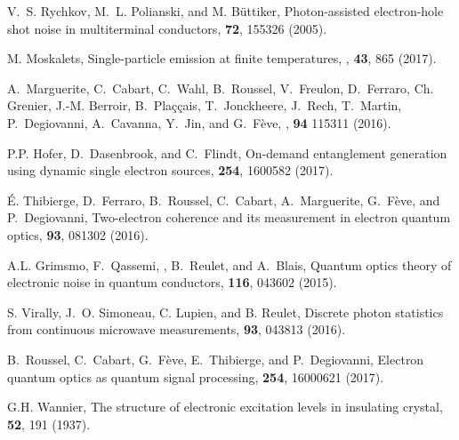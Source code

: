 \documentclass[aps,prb,superscriptaddress,preprint]{revtex4-1}
\begin{document}
\begin{thebibliography}{1}
		V.~S. Rychkov, M.~L. Polianski, and M. B\"uttiker,
		\newblock Photon-assisted electron-hole shot noise in multiterminal conductors,
		 {\bf 72}, 155326 (2005).
		
		M. Moskalets, Single-particle emission at finite temperatures, , {\bf 43}, 865 (2017).
		
		
		A.~Marguerite, C.~Cabart, C.~Wahl, B.~Roussel, V.~Freulon, D.~Ferraro, Ch.
		Grenier, J.-M. Berroir, B.~{Pla\ifmmode \mbox\c{c}\else \c{c}\fi{}ais},
		T.~Jonckheere, J.~Rech, T.~Martin, P.~Degiovanni, A.~Cavanna, Y.~Jin, and
		G.~F{\`e}ve,
		,
		 {\bf 94} 115311 (2016).
		
		P.P. Hofer, D.~Dasenbrook, and C.~Flindt,
		\newblock On-demand entanglement generation using dynamic single electron
		sources,
		 {\bf 254}, 1600582 (2017).
		
		\'E. Thibierge, D.~Ferraro, B.~Roussel, C.~Cabart, A.~Marguerite, G.~F\`eve,
		and P.~Degiovanni,
		\newblock Two-electron coherence and its measurement in electron quantum
		optics,
		 {\bf 93}, 081302 (2016).
		
		A.L. Grimsmo, F.~Qassemi, , B.~Reulet, and A.~Blais,
		\newblock Quantum optics theory of electronic noise in quantum conductors,
		  {\bf 116}, 043602  (2015).
		
		S. Virally, J.~O. Simoneau, C. Lupien, and B.
		Reulet,
		\newblock Discrete photon statistics from continuous microwave measurements,
		 {\bf 93}, 043813 (2016).
		
		B.~Roussel, C.~Cabart, G.~F{\`e}ve, E.~Thibierge, and P.~Degiovanni,
		\newblock Electron quantum optics as quantum signal processing,
		 {\bf 254}, 16000621 (2017).
		
		
		G.H. Wannier,
		\newblock The structure of electronic excitation levels in insulating crystal,
		 {\bf 52}, 191 (1937).
		

\end{thebibliography}
\end{document}

